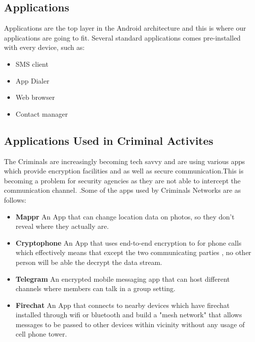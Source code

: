 \subsection{Applications}

Applications are the top layer in the Android architecture and this is where our applications are going to fit. Several standard applications comes pre-installed with every device, such as: 

\begin{itemize}

\item SMS client 

\item App Dialer

\item Web browser

\item Contact manager
\end{itemize}

\subsection{Applications Used in Criminal Activites}
The Criminals are increasingly becoming tech savvy and are using various apps which provide encryption facilities and as well as secure communication.This is becoming a problem for security agencies as they are not able to intercept the communication channel. .Some of the apps used by Criminals Networks are as follows:

\begin{itemize}
\item \textbf{Mappr} An App that can change location data on photos, so they don't reveal where they actually are.
\item \textbf{Cryptophone }An App that uses end-to-end encryption to for phone calls which effectively means that except the two communicating parties , no other person will be able the decrypt the data stream.
\item \textbf{Telegram} An  encrypted mobile messaging app that can host different channels where  members can talk in a group setting.
\item \textbf{Firechat} An App that connects to nearby devices which have firechat installed through wifi or bluetooth and build a "mesh network" that allows messages to be passed to other devices within vicinity without any usage of cell phone tower.
\end{itemize}


\clearpage


